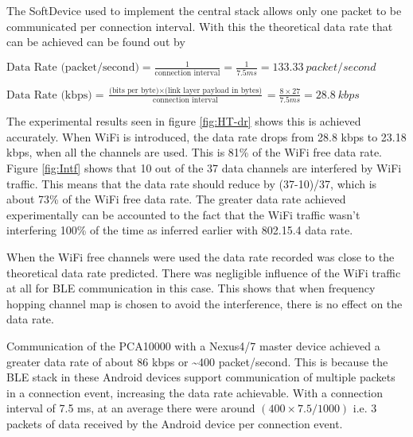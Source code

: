 The SoftDevice used to implement the central stack allows only one packet to be communicated per connection interval. With this the theoretical data rate that can be achieved can be found out by 

$\mbox{Data Rate  (packet/second)}=\frac{1}{\mbox{connection interval}}=\frac{1}{7.5ms}=133.33\:packet/second$

\vspace{15 pt}
$\mbox{Data Rate (kbps)}=\frac{\mbox{(bits per byte)}\times\mbox{(link layer payload in bytes)}}{\mbox{connection interval}}=\frac{8\times27}{7.5ms}=28.8\:kbps$
\vspace{10 pt}

The experimental results seen in figure \ref{fig:HT-dr} shows this is achieved accurately. When WiFi is introduced, the data rate drops from 28.8 kbps to 23.18 kbps, when all the channels are used. This is 81\% of the WiFi free data rate. Figure \ref{fig:Intf} shows that 10 out of the 37 data channels are interfered by WiFi traffic. This means that the data rate should reduce by (37-10)/37, which is about 73\% of the WiFi free data rate. The greater data rate achieved experimentally can be accounted to the fact that the WiFi traffic wasn't interfering 100\% of the time as inferred earlier with 802.15.4 data rate. 

When the WiFi free channels were used the data rate recorded was close to the theoretical data rate predicted. There was negligible influence of the WiFi traffic at all for BLE communication in this case. This shows that when frequency hopping channel map is chosen to avoid the interference, there is no effect on the data rate.

Communication of the PCA10000 with a Nexus4/7 master device achieved a greater data rate of about 86 kbps or \textasciitilde400 packet/second. This is because the BLE stack in these Android devices support communication of multiple packets in a connection event, increasing the data rate achievable. With a connection interval of 7.5 ms, at an average there were around $(400\times7.5/1000)$ i.e. 3 packets of data received by the Android device per connection event.


